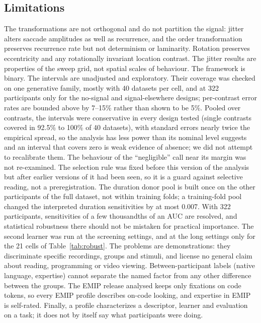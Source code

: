 \documentclass[man,floatsintext,12pt]{apa7}
\begin{document}
\subsection{Limitations}
The transformations are not orthogonal and do not partition the signal: jitter alters saccade amplitudes as well as recurrence, and the order transformation preserves recurrence rate but not determinism or laminarity. Rotation preserves eccentricity and any rotationally invariant location contrast. The jitter results are properties of the sweep grid, not spatial scales of behaviour. The framework is binary. The intervals are unadjusted and exploratory. Their coverage was checked on one generative family, mostly with 40 datasets per cell, and at 322 participants only for the no-signal and signal-elsewhere designs; per-contrast error rates are bounded above by 7--15\% rather than shown to be 5\%. Pooled over contrasts, the intervals were conservative in every design tested (single contrasts covered in 92.5\% to 100\% of 40 datasets), with standard errors nearly twice the empirical spread, so the analysis has less power than its nominal level suggests and an interval that covers zero is weak evidence of absence; we did not attempt to recalibrate them. The behaviour of the ``negligible'' call near its margin was not re-examined. The selection rule was fixed before this version of the analysis but after earlier versions of it had been seen, so it is a guard against selective reading, not a preregistration. The duration donor pool is built once on the other participants of the full dataset, not within training folds; a training-fold pool changed the interpreted duration sensitivities by at most 0.007. With 322 participants, sensitivities of a few thousandths of an AUC are resolved, and statistical robustness there should not be mistaken for practical importance. The second learner was run at the screening settings, and at the long settings only for the 21 cells of Table~\ref{tab:robust}. The problems are demonstrations: they discriminate specific recordings, groups and stimuli, and license no general claim about reading, programming or video viewing. Between-participant labels (native language, expertise) cannot separate the named factor from any other difference between the groups. The EMIP release analysed keeps only fixations on code tokens, so every EMIP profile describes on-code looking, and expertise in EMIP is self-rated. Finally, a profile characterizes a descriptor, learner and evaluation on a task; it does not by itself say what participants were doing.
\end{document}
